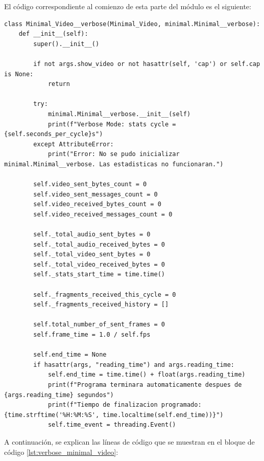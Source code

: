 El código correspondiente al comienzo de esta parte del módulo es el siguiente:

\begin{lstlisting}[style=pythonstyle, caption={Código de la inicialización de Minimal\_Video\_verbose}, label={lst:verbose_minimal_video}]
class Minimal_Video__verbose(Minimal_Video, minimal.Minimal__verbose):
    def __init__(self):
        super().__init__()

        if not args.show_video or not hasattr(self, 'cap') or self.cap is None:
            return

        try:
            minimal.Minimal__verbose.__init__(self)
            print(f"Verbose Mode: stats cycle = {self.seconds_per_cycle}s")
        except AttributeError:
            print("Error: No se pudo inicializar minimal.Minimal__verbose. Las estadisticas no funcionaran.")

        self.video_sent_bytes_count = 0
        self.video_sent_messages_count = 0
        self.video_received_bytes_count = 0
        self.video_received_messages_count = 0

        self._total_audio_sent_bytes = 0
        self._total_audio_received_bytes = 0
        self._total_video_sent_bytes = 0
        self._total_video_received_bytes = 0
        self._stats_start_time = time.time()

        self._fragments_received_this_cycle = 0
        self._fragments_received_history = []

        self.total_number_of_sent_frames = 0
        self.frame_time = 1.0 / self.fps

        self.end_time = None
        if hasattr(args, "reading_time") and args.reading_time:
            self.end_time = time.time() + float(args.reading_time)
            print(f"Programa terminara automaticamente despues de {args.reading_time} segundos")
            print(f"Tiempo de finalizacion programado: {time.strftime('%H:%M:%S', time.localtime(self.end_time))}")
            self.time_event = threading.Event()
\end{lstlisting}
\vspace{\baselineskip}

A continuación, se explican las líneas de código que se muestran en el bloque de código \ref{lst:verbose_minimal_video}:

